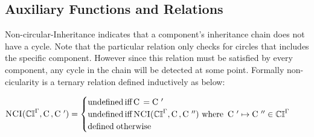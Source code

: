 \documentclass{article}
\begin{document}
\begin{mathparpagebreakable}

\end{mathparpagebreakable}

\subsection{Auxiliary Functions and Relations}

Non-circular-Inheritance indicates that a component's inheritance chain does not have a cycle. Note that the particular relation only checks for circles that includes the specific component. However since this relation must be satisfied by every component, any cycle in the chain will be detected at some point. Formally non-cicularity is a ternary relation defined inductively as below:

\begin{math}
  \noncircular(\tcimap, \component, \component') =
  \begin{cases}
    \text{undefined} \tiff \component = \component' \\ 
    \text{undefined} \tiff \noncircular(\tcimap, \component, \component'')
      \text{ where } \component' \mapsto \component'' \in \tcimap \\ 
    \text{defined} \; \textrm{otherwise}  
  \end{cases}
\end{math}
\end{document}
